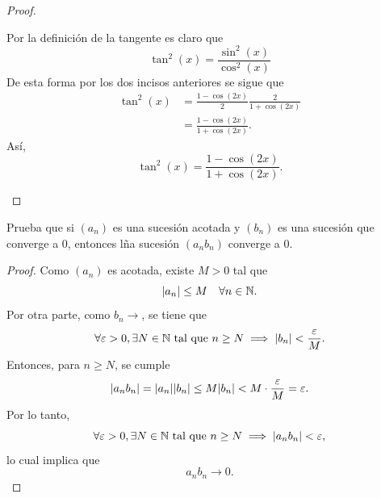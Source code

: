 \documentclass[12pt,a4paper]{article}
\begin{document}
\begin{proof}
\begin{enumerate}
            Por la definición de la tangente es claro que
            \begin{equation*}
                \tan^{2}(x)=\frac{\sin^{2}(x)}{\cos^{2}(x)}
            \end{equation*}
            De esta forma por los dos incisos anteriores se sigue que
            \begin{align*}
                \tan^{2}(x)&=\frac{1-\cos(2x)}{2}\frac{2}{1+\cos(2x)}\\
                &=\frac{1-\cos(2x)}{1+\cos(2x)}.
            \end{align*}
            Así,
            \begin{equation*}
                \tan^{2}(x)=\frac{1-\cos(2x)}{1+\cos(2x)}.
            \end{equation*}
        \end{enumerate}
    \end{proof}

    \begin{mdframed}[style=mdbluebox,frametitle={Ejercicio 3}]
        Prueba que si $(a_{n})$ es una sucesión acotada y $(b_{n})$ es una sucesión que converge
        a 0, entonces lña sucesión $(a_{n}b_{n})$ converge a 0.
    \end{mdframed}

    \begin{proof}
        Como $(a_{n})$ es acotada, existe $M\gt0$ tal que
        \begin{equation*}
            \abs{a_{n}}\leq M\quad\forall n\in\mathbb{N}.
        \end{equation*}
        Por otra parte, como $b_{n}\to$, se tiene que
        \begin{equation*}
            \forall\varepsilon>0,\exists N\in\mathbb{N}\text{ tal que }n\geq N\implies\abs{b_{n}}<\frac{\varepsilon}{M}.
        \end{equation*}
        Entonces, para $n\geq N$, se cumple
        \begin{equation*}
            \abs{a_{n}b_{n}}=\abs{a_{n}}\abs{b_{n}}\leq M\abs{b_{n}}< M\cdot\frac{\varepsilon}{M}=\varepsilon.
        \end{equation*}
        Por lo tanto,
        \begin{equation*}
            \forall\varepsilon>0,\exists N\in\mathbb{N}\text{ tal que }n\geq N\implies\abs{a_{n}b_{n}}<\varepsilon,
        \end{equation*}
        lo cual implica que
        \begin{equation*}
            a_{n}b_{n}\to0.
        \end{equation*}
    \end{proof}
\end{document}
